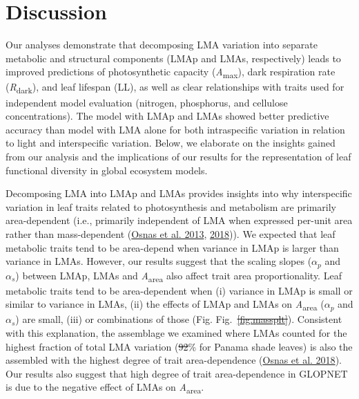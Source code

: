 \documentclass[
  12pt,
  a4paper,
,tablecaptionabove
]{scrartcl}
\providecommand{\DIFaddtex}[1]{{\protect\color{blue}\uwave{#1}}} %
\providecommand{\DIFdeltex}[1]{{\protect\color{red}\sout{#1}}}                      %
\providecommand{\DIFaddbegin}{} %
\providecommand{\DIFaddend}{} %
\providecommand{\DIFdelbegin}{} %
\providecommand{\DIFdelend}{} %
\providecommand{\DIFadd}[1]{\texorpdfstring{\DIFaddtex{#1}}{#1}} %
\providecommand{\DIFdel}[1]{\texorpdfstring{\DIFdeltex{#1}}{}} %
\newcommand{\DIFscaledelfig}{0.5}
\newlength{\DIFdelgraphicswidth} %
\newlength{\DIFdelgraphicsheight} %
\newcommand{\DIFaddincludegraphics}[2][]{{\color{blue}\fbox{\DIFOincludegraphics[#1]{#2}}}} %
\newcommand{\DIFdelincludegraphics}[2][]{%
\sbox{\DIFdelgraphicsbox}{\DIFOincludegraphics[#1]{#2}}%
\settoboxwidth{\DIFdelgraphicswidth}{\DIFdelgraphicsbox} %
\settoboxtotalheight{\DIFdelgraphicsheight}{\DIFdelgraphicsbox} %
\scalebox{\DIFscaledelfig}{%
\parbox[b]{\DIFdelgraphicswidth}{\usebox{\DIFdelgraphicsbox}\\[-\baselineskip] \rule{\DIFdelgraphicswidth}{0em}}\llap{\resizebox{\DIFdelgraphicswidth}{\DIFdelgraphicsheight}{%
\setlength{\unitlength}{\DIFdelgraphicswidth}%
\begin{picture}(1,1)%
\thicklines\linethickness{2pt} %
{\color[rgb]{1,0,0}\put(0,0){\framebox(1,1){}}}%
{\color[rgb]{1,0,0}\put(0,0){\line( 1,1){1}}}%
{\color[rgb]{1,0,0}\put(0,1){\line(1,-1){1}}}%
\end{picture}%
}\hspace*{3pt}}} %
} %
\DeclareRobustCommand{\DIFaddbegin}{\DIFOaddbegin \let\includegraphics\DIFaddincludegraphics} %
\DeclareRobustCommand{\DIFaddend}{\DIFOaddend \let\includegraphics\DIFOincludegraphics} %
\DeclareRobustCommand{\DIFdelbegin}{\DIFOdelbegin \let\includegraphics\DIFdelincludegraphics} %
\DeclareRobustCommand{\DIFdelend}{\DIFOaddend \let\includegraphics\DIFOincludegraphics} %
\begin{document}
\hypertarget{discussion}{%
\section{Discussion}\label{discussion}}

Our analyses demonstrate that decomposing LMA variation into separate
metabolic and structural components (LMAp and LMAs, respectively) leads
to improved predictions of photosynthetic capacity
(\emph{A}\textsubscript{max}), dark respiration rate
(\emph{R}\textsubscript{dark}), and leaf lifespan (LL), as well as clear
relationships with traits used for independent model evaluation
(nitrogen, phosphorus, and cellulose concentrations). The model with
LMAp and LMAs showed better predictive accuracy than model with LMA
alone for both intraspecific variation in relation to light and
interspecific variation. Below, we elaborate on the insights gained from
our analysis and the implications of our results for the representation
of leaf functional diversity in global ecosystem models.

Decomposing LMA into LMAp and LMAs provides insights into why
interspecific variation in leaf traits related to photosynthesis and
metabolism are primarily area-dependent (i.e., primarily independent of
LMA when expressed per-unit area rather than mass-dependent
(\protect\hyperlink{ref-Osnas2013}{Osnas et al. 2013},
\protect\hyperlink{ref-Osnas2018}{2018})). We expected that leaf
metabolic traits tend to be area-depend when variance in LMAp is larger
than variance in LMAs. However, our results suggest that the scaling
slopes (\(\alpha_p\) and \(\alpha_s\)) between LMAp, LMAs and
\emph{A}\textsubscript{area} also affect trait area proportionality.
Leaf metabolic traits tend to be area-dependent when (i) variance in
LMAp is small or similar to variance in LMAs, (ii) the effects of LMAp
and LMAs on \emph{A}\textsubscript{area} (\(\alpha_p\) and \(\alpha_s\))
are small, (iii) or combinations of those (Fig. Fig.~\DIFdelbegin \DIFdel{\ref{fig:massplt}}\DIFdelend \DIFaddbegin \DIFadd{\ref{fig-massplt}}\DIFaddend ).
Consistent with this explanation, the assemblage we examined where LMAs
counted for the highest fraction of total LMA variation (\DIFdelbegin \DIFdel{92}\DIFdelend \DIFaddbegin \DIFadd{92.3}\DIFaddend \% for
Panama shade leaves) is also the assembled with the highest degree of
trait area-dependence (\protect\hyperlink{ref-Osnas2018}{Osnas et al.
2018}). Our results also suggest that high degree of trait
area-dependence in GLOPNET is due to the negative effect of LMAs on
\emph{A}\textsubscript{area}.
\end{document}
